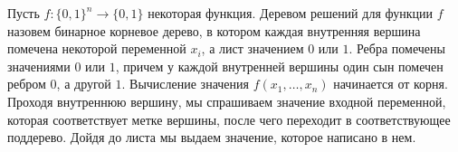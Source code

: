 Пусть $f: \{0, 1\}^n \rightarrow \{0, 1\}$ некоторая функция. Деревом решений для функции $f$ назовем бинарное корневое
дерево, в котором каждая внутренняя вершина помечена некоторой переменной $x_i$, а лист значением $0$ или $1$. Ребра помечены
значениями $0$ или $1$, причем у каждой внутренней вершины один сын помечен ребром $0$, а другой $1$. Вычисление значения
$f(x_1, \dots, x_n)$ начинается от корня. Проходя внутреннюю вершину, мы спрашиваем значение входной переменной, которая
соответствует метке вершины, после чего переходит в соответствующее поддерево. Дойдя до листа мы выдаем значение, которое
написано в нем.
